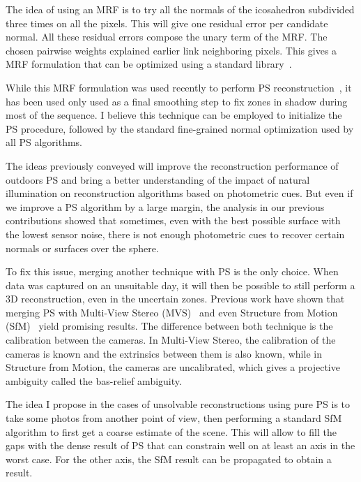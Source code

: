 \documentclass{report}
\begin{document}
The idea of using an MRF is to try all the normals of the icosahedron subdivided three times on all the pixels. This will give one residual error per candidate normal. All these residual errors compose the unary term of the MRF. The chosen pairwise weights explained earlier link neighboring pixels. This gives a MRF formulation that can be optimized using a standard library~\cite{Boykov2001a,Kolmogorov2004a,Boykov2004,Bagon2006}.

While this MRF formulation was used recently to perform PS reconstruction~\cite{jung-cvpr-15}, it has been used only used as a final smoothing step to fix zones in shadow during most of the sequence. I believe this technique can be employed to initialize the PS procedure, followed by the standard fine-grained normal optimization used by all PS algorithms.


The ideas previously conveyed will improve the reconstruction performance of outdoors PS and bring a better understanding of the impact of natural illumination on reconstruction algorithms based on photometric cues. But even if we improve a PS algorithm by a large margin, the analysis in our previous contributions showed that sometimes, even with the best possible surface with the lowest sensor noise, there is not enough photometric cues to recover certain normals or surfaces over the sphere.

To fix this issue, merging another technique with PS is the only choice. When data was captured on an unsuitable day, it will then be possible to still perform a 3D reconstruction, even in the uncertain zones. Previous work have shown that merging PS with Multi-View Stereo (MVS)~\cite{Beljan2012,Zhou2013,ackermann-3dv-14,HernandezEsteban2008} and even Structure from Motion (SfM)~\cite{zhang-iccv-03,lim-iccv-05} yield promising results. The difference between both technique is the calibration between the cameras. In Multi-View Stereo, the calibration of the cameras is known and the extrinsics between them is also known, while in Structure from Motion, the cameras are uncalibrated, which gives a projective ambiguity called the bas-relief ambiguity.

The idea I propose in the cases of unsolvable reconstructions using pure PS is to take some photos from another point of view, then performing a standard SfM algorithm to first get a coarse estimate of the scene. This will allow to fill the gaps with the dense result of PS that can constrain well on at least an axis in the worst case. For the other axis, the SfM result can be propagated to obtain a result.
\end{document}
